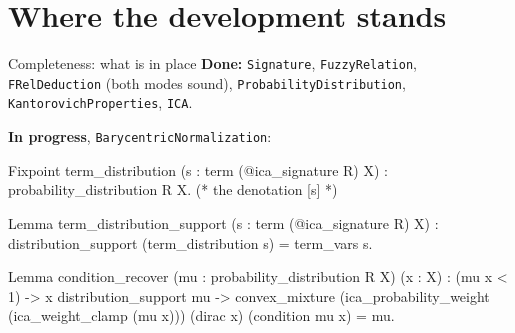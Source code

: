 \documentclass[10pt,aspectratio=169]{beamer}
\newcommand{\file}[1]{{\color{rocqcon}\texttt{#1}}}
\begin{document}
                \section{Where the development stands}

                \begin{frame}[fragile]{Completeness: what is in place}
                    \textbf{Done:} \file{Signature}, \file{FuzzyRelation},
                    \file{FRelDeduction} (both modes sound),
                    \file{ProbabilityDistribution},
                    \file{KantorovichProperties},
                    \file{ICA}.
                    \medskip

                    \textbf{In progress},
                    \file{BarycentricNormalization}:
                    \begin{srcbox}
Fixpoint term_distribution (s : term (@ica_signature R) X)
  : probability_distribution R X.       (* the denotation [s] *)

Lemma term_distribution_support (s : term (@ica_signature R) X) :
  distribution_support (term_distribution s) = term_vars s.

Lemma condition_recover (mu : probability_distribution R X) (x : X) :
  (mu x < 1) -> x \in distribution_support mu ->
  convex_mixture (ica_probability_weight (ica_weight_clamp (mu x)))
    (dirac x) (condition mu x) = mu.
                    \end{srcbox}
                \end{frame}
\end{document}
